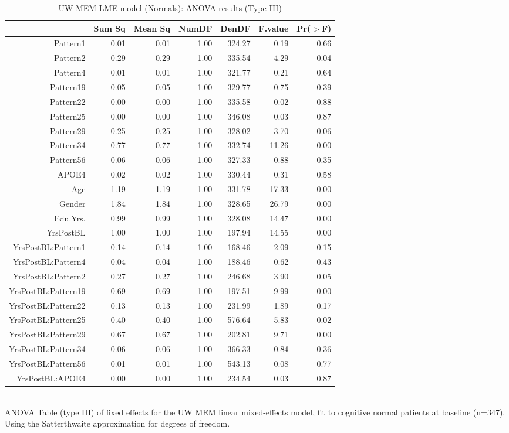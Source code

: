 \documentclass{article}
\begin{document}
\begin{table}[ht]
\caption{UW MEM LME model (Normals): ANOVA results (Type III) }
\centering
\begin{tabular}{rrrrrrr}
  \hline
 & Sum Sq & Mean Sq & NumDF & DenDF & F.value & Pr($>$F) \\ 
  \hline
  Pattern1 & 0.01 & 0.01 & 1.00 & 324.27 & 0.19 & 0.66 \\ 
  Pattern2 & 0.29 & 0.29 & 1.00 & 335.54 & 4.29 & 0.04 \\ 
  Pattern4 & 0.01 & 0.01 & 1.00 & 321.77 & 0.21 & 0.64 \\ 
  Pattern19 & 0.05 & 0.05 & 1.00 & 329.77 & 0.75 & 0.39 \\ 
  Pattern22 & 0.00 & 0.00 & 1.00 & 335.58 & 0.02 & 0.88 \\ 
  Pattern25 & 0.00 & 0.00 & 1.00 & 346.08 & 0.03 & 0.87 \\ 
  Pattern29 & 0.25 & 0.25 & 1.00 & 328.02 & 3.70 & 0.06 \\ 
  Pattern34 & 0.77 & 0.77 & 1.00 & 332.74 & 11.26 & 0.00 \\ 
  Pattern56 & 0.06 & 0.06 & 1.00 & 327.33 & 0.88 & 0.35 \\ 
  APOE4 & 0.02 & 0.02 & 1.00 & 330.44 & 0.31 & 0.58 \\ 
  Age & 1.19 & 1.19 & 1.00 & 331.78 & 17.33 & 0.00 \\ 
  Gender & 1.84 & 1.84 & 1.00 & 328.65 & 26.79 & 0.00 \\ 
  Edu.Yrs. & 0.99 & 0.99 & 1.00 & 328.08 & 14.47 & 0.00 \\ 
  YrsPostBL & 1.00 & 1.00 & 1.00 & 197.94 & 14.55 & 0.00 \\ 
  YrsPostBL:Pattern1 & 0.14 & 0.14 & 1.00 & 168.46 & 2.09 & 0.15 \\ 
  YrsPostBL:Pattern4 & 0.04 & 0.04 & 1.00 & 188.46 & 0.62 & 0.43 \\ 
  YrsPostBL:Pattern2 & 0.27 & 0.27 & 1.00 & 246.68 & 3.90 & 0.05 \\ 
  YrsPostBL:Pattern19 & 0.69 & 0.69 & 1.00 & 197.51 & 9.99 & 0.00 \\ 
  YrsPostBL:Pattern22 & 0.13 & 0.13 & 1.00 & 231.99 & 1.89 & 0.17 \\ 
  YrsPostBL:Pattern25 & 0.40 & 0.40 & 1.00 & 576.64 & 5.83 & 0.02 \\ 
  YrsPostBL:Pattern29 & 0.67 & 0.67 & 1.00 & 202.81 & 9.71 & 0.00 \\ 
  YrsPostBL:Pattern34 & 0.06 & 0.06 & 1.00 & 366.33 & 0.84 & 0.36 \\ 
  YrsPostBL:Pattern56 & 0.01 & 0.01 & 1.00 & 543.13 & 0.08 & 0.77 \\ 
  YrsPostBL:APOE4 & 0.00 & 0.00 & 1.00 & 234.54 & 0.03 & 0.87 \\ 
   \hline
\end{tabular}
\\[10pt]
ANOVA Table (type III) of fixed effects for the UW MEM linear mixed-effects model, fit to cognitive normal patients at baseline (n=347). Using the Satterthwaite approximation for degrees of freedom.
\end{table}
\end{document}
